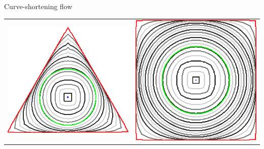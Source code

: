 \begin{frame}
{Curve-shortening flow}

\begin{center}

\begin{tabular}{cc}
\includegraphics[scale=0.1]{figures/curve-shortening-flow/no-neighborhood-flow-always-evolve/0.015625/triangle.png}\hspace{3em} &
\includegraphics[scale=0.08]{figures/curve-shortening-flow/no-neighborhood-flow-always-evolve/0.015625/square.png}\\[1em]

\end{tabular}
\end{center}
\end{frame}
